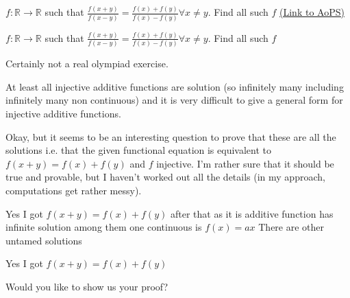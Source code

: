 \begin{problem}
	$f:\mathbb{R}\to\mathbb{R}$ such that 
$\frac {f(x+y)}{f(x-y)}=\frac{f(x)+f(y)}{f(x)-f(y)}\forall x\ne y$. Find all such $f$
	\flushright \href{https://artofproblemsolving.com/community/c6h1570396}{(Link to AoPS)}
\end{problem}



\begin{solution}
	\begin{tcolorbox}$f:\mathbb{R}\to\mathbb{R}$ such that 
$\frac {f(x+y)}{f(x-y)}=\frac{f(x)+f(y)}{f(x)-f(y)}\forall x\ne y$. Find all such $f$\end{tcolorbox}
Certainly not a real olympiad exercise.

At least all injective additive functions are solution (so infinitely many including infinitely many non continuous) and it is very difficult to give a general form for injective additive functions.



\end{solution}



\begin{solution}
	Okay, but it seems to be an interesting question to prove that these are all the solutions i.e. that the given functional equation is equivalent to $f(x+y)=f(x)+f(y)$ and $f$ injective. I'm rather sure that it should be true and provable, but I haven't worked out all the details (in my approach, computations get rather messy).
\end{solution}



\begin{solution}
	Yes I got $f(x+y) =f(x)+f(y)$ after that as it is additive function has infinite solution among them one continuous is $f(x)=ax$ There are other untamed solutions 
\end{solution}



\begin{solution}
	\begin{tcolorbox}Yes I got $f(x+y) =f(x)+f(y)$\end{tcolorbox} Would you like to show us your proof?


\end{solution}




